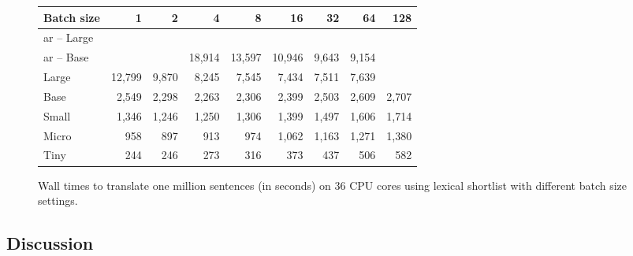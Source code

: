 \begin{figure}
  \centering

  
  \vspace{1\baselineskip}

  \begin{tabular}{lrrrrrrrr}
    \toprule
    Batch size & 1 & 2 & 4 & 8 & 16 & 32 & 64 & 128 \\
    \midrule
    \acs{ar} -- Large &&  &  &  &  &  & & \\
    \acs{ar} -- Base  &&  & 18,914 & 13,597 & 10,946 & 9,643 & 9,154 & \\
    \midrule
    Large & 12,799 & 9,870 & 8,245 & 7,545 & 7,434 & 7,511 & 7,639 & \\
    Base  &  2,549 & 2,298 & 2,263 & 2,306 & 2,399 & 2,503 & 2,609 & 2,707 \\
    Small &  1,346 & 1,246 & 1,250 & 1,306 & 1,399 & 1,497 & 1,606 & 1,714 \\
    Micro &    958 &   897 &   913 &   974 & 1,062 & 1,163 & 1,271 & 1,380 \\
    Tiny  &    244 &   246 &   273 &   316 &   373 &   437 &   506 &   582 \\
    \bottomrule
  \end{tabular}

  \caption{Wall times to translate one million sentences (in seconds) on 36 CPU
    cores using lexical shortlist with different batch size settings.}%
  \label{fig:throughput:cpu36}
\end{figure}


\subsection{Discussion}%
\label{subsec:results:discussion}


